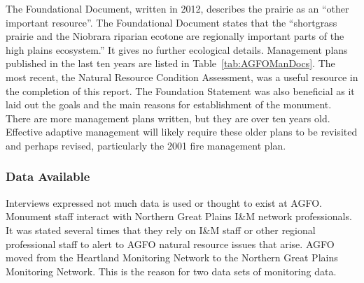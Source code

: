 The Foundational Document, written in 2012, describes the prairie as an ``other important resource''. 
The Foundational Document states that the ``shortgrass prairie and the Niobrara riparian ecotone are regionally important parts of the high plains ecosystem.'' 
It gives no further ecological details. 
Management plans published in the last ten years are listed in Table~\ref{tab:AGFOManDocs}. 
The most recent, the Natural Resource Condition Assessment, was a useful resource in the completion of this report. 
The Foundation Statement was also beneficial as it laid out the goals and the main reasons for establishment of the monument. 
There are more management plans written, but they are over ten years old.
Effective adaptive management will likely require these older plans to be revisited and perhaps revised, particularly the 2001 fire management plan.

\subsubsection{Data Available}

Interviews expressed not much data is used or thought to exist at AGFO.
Monument staff interact with Northern Great Plains I\&M network professionals. 
It was stated several times that they rely on I\&M staff or other regional professional staff to alert to AGFO natural resource issues that arise. 
AGFO moved from the Heartland Monitoring Network to the Northern Great Plains Monitoring Network. 
This is the reason for two data sets of monitoring data.

